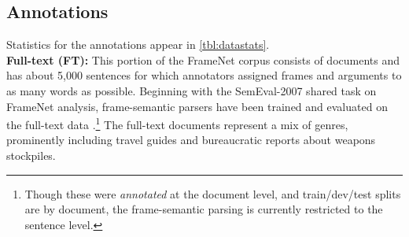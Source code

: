 \documentclass[11pt,a4paper]{article}
\newcommand{\fnf}[1]{\textsc{\textsf{#1}}} %
\newcommand{\fnr}[1]{\textbf{\textsf{#1}}} %
\newcommand{\finalversion}[1]{#1}
\begin{document}
\subsection{Annotations}
Statistics for the annotations appear in \cref{tbl:datastats}.\\
\textbf{Full-text (FT):} This portion of the FrameNet corpus consists of documents and has about 5,000
sentences for which annotators assigned frames and arguments to as many words as possible.
Beginning with the SemEval-2007 shared task on FrameNet analysis,
frame-semantic parsers have been trained and evaluated on the full-text data
 \citep{baker-07,das-14}.\footnote{Though these 
were \emph{annotated} at the document level, and train/dev/test splits are by document, the frame-semantic parsing 
is currently restricted to the sentence level.}
% 
% 
The full-text documents represent a mix of genres, prominently including travel guides 
and bureaucratic reports about weapons stockpiles. 
\end{document}
